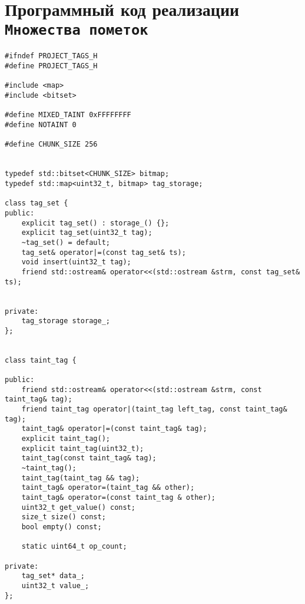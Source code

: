 \chapter{Программный код реализации \texttt{Множества пометок}}
\label{tagsetimpl}

\begin{lstlisting}[environoment=сpp_code, caption=tags.h, captionpos=b]
#ifndef PROJECT_TAGS_H
#define PROJECT_TAGS_H

#include <map>
#include <bitset>

#define MIXED_TAINT 0xFFFFFFFF
#define NOTAINT 0

#define CHUNK_SIZE 256


typedef std::bitset<CHUNK_SIZE> bitmap;
typedef std::map<uint32_t, bitmap> tag_storage;

class tag_set {
public:
    explicit tag_set() : storage_() {};
    explicit tag_set(uint32_t tag);
    ~tag_set() = default;
    tag_set& operator|=(const tag_set& ts);
    void insert(uint32_t tag);
    friend std::ostream& operator<<(std::ostream &strm, const tag_set& ts);

    
private:
    tag_storage storage_;
};


class taint_tag {

public:
    friend std::ostream& operator<<(std::ostream &strm, const taint_tag& tag);
    friend taint_tag operator|(taint_tag left_tag, const taint_tag& tag);
    taint_tag& operator|=(const taint_tag& tag);
    explicit taint_tag();
    explicit taint_tag(uint32_t);
    taint_tag(const taint_tag& tag);
    ~taint_tag();
    taint_tag(taint_tag && tag);
    taint_tag& operator=(taint_tag && other);
    taint_tag& operator=(const taint_tag & other);
    uint32_t get_value() const;
    size_t size() const;
    bool empty() const;

    static uint64_t op_count;

private:
    tag_set* data_;
    uint32_t value_;
};
\end{lstlisting}

